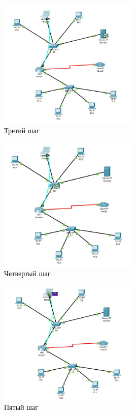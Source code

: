\documentclass[bachelor, och, labwork]{shiza}
\begin{document}
\begin{enumerate}
\begin{enumerate}
        \begin{figure}[H]
            \centering      %
            \includegraphics[width=0.6\textwidth]{10}
            \caption{Третий шаг}
            \label{fig:image1}
        \end{figure}

        \begin{figure}[H]
            \centering      %
            \includegraphics[width=0.6\textwidth]{11}
            \caption{Четвертый шаг}
            \label{fig:image1}
        \end{figure}

        \begin{figure}[H]
            \centering      %
            \includegraphics[width=0.6\textwidth]{12}
            \caption{Пятый шаг}
            \label{fig:image1}
        \end{figure}


\end{enumerate}
\end{enumerate}
\end{document}
